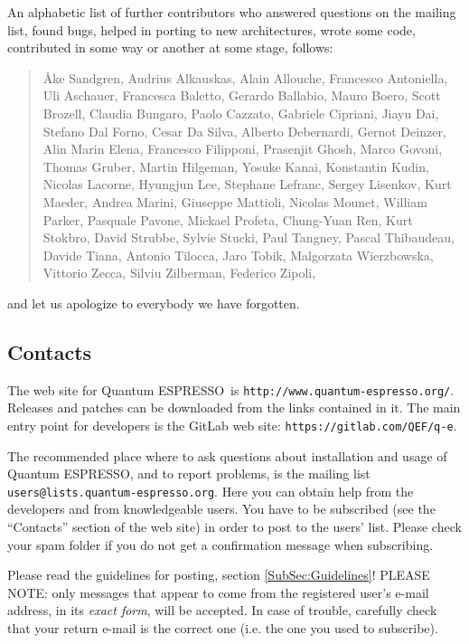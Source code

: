\documentclass[12pt,a4paper]{article}
\def\qe{{\sc Quantum ESPRESSO}}
\begin{document}
An alphabetic list of further
contributors who answered questions on the mailing list, found
bugs, helped in porting to new architectures, wrote some code,
contributed in some way or another at some stage, follows:
\begin{quote}
  {\AA}ke Sandgren, Audrius Alkauskas, Alain Allouche, Francesco Antoniella,
  Uli Aschauer, Francesca Baletto, Gerardo Ballabio, Mauro Boero,
  Scott Brozell, Claudia Bungaro, Paolo Cazzato, Gabriele Cipriani,
  Jiayu Dai, Stefano Dal Forno, Cesar Da Silva, Alberto Debernardi,
  Gernot Deinzer, Alin Marin Elena, Francesco Filipponi, Prasenjit Ghosh,
  Marco Govoni, Thomas Gruber, Martin Hilgeman, Yosuke Kanai, Konstantin Kudin,
  Nicolas Lacorne, Hyungjun Lee, Stephane Lefranc, Sergey Lisenkov, Kurt Maeder,
  Andrea Marini, Giuseppe Mattioli, Nicolas Mounet, William Parker,
  Pasquale Pavone, Mickael Profeta, Chung-Yuan Ren,
  Kurt Stokbro, David Strubbe, Sylvie Stucki, Paul Tangney, Pascal Thibaudeau,
  Davide Tiana, Antonio Tilocca, Jaro Tobik, Malgorzata Wierzbowska,
  Vittorio Zecca, Silviu Zilberman, Federico Zipoli,
\end{quote}
and let us apologize to everybody we have forgotten.

\subsection{Contacts}
\label{SubSec:Contacts}

The web site for \qe\ is \texttt{http://www.quantum-espresso.org/}.
Releases and patches can be downloaded from the links contained in it.
The main entry point for developers is the GitLab web site:
\texttt{https://gitlab.com/QEF/q-e}.

The recommended place where to ask questions about installation
and usage of \qe, and to report problems, is the
mailing list \texttt{users@lists.quantum-espresso.org}.
Here you can obtain help from the developers and from
knowledgeable users. You have to be subscribed (see the ``Contacts''
section of the web site) in order to post to the  users' list.
Please check your spam folder if you do not get a confirmation
message when subscribing.

Please read the guidelines for posting, section \ref{SubSec:Guidelines}!
PLEASE NOTE: only messages that appear to come from the
registered user's e-mail address, in its {\em exact form}, will be
accepted. In case of trouble, carefully check that your return
e-mail is the correct one (i.e. the one you used to subscribe).
\end{document}
